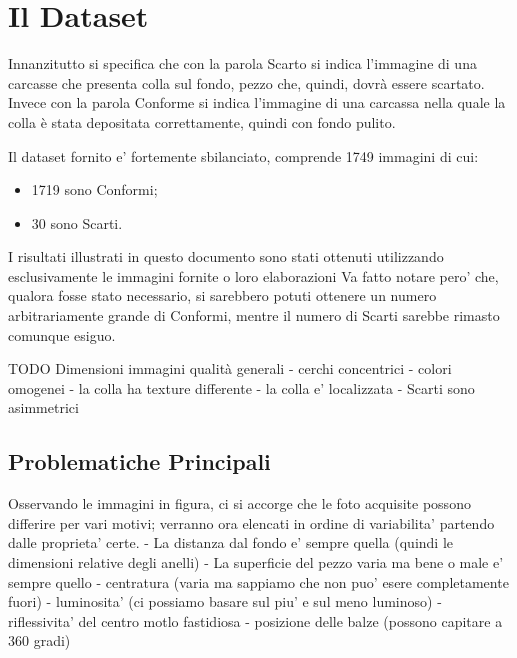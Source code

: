 
\chapter{Il Dataset}

Innanzitutto si specifica che con la parola Scarto si indica l'immagine di una carcasse che presenta colla sul fondo, pezzo che, quindi, dovrà essere scartato.
Invece con la parola Conforme si indica l'immagine di una carcassa nella quale la colla è stata depositata correttamente, quindi con fondo pulito.

Il dataset fornito e' fortemente sbilanciato, comprende 1749 immagini di cui:
\begin{itemize}
    \item 1719 sono Conformi;
    \item 30 sono Scarti.
\end{itemize}
I risultati illustrati in questo documento sono stati ottenuti utilizzando esclusivamente le immagini fornite o loro elaborazioni
Va fatto notare pero' che, qualora fosse stato necessario, si sarebbero potuti ottenere un numero arbitrariamente grande di Conformi, mentre il numero di Scarti sarebbe rimasto comunque esiguo.

TODO
Dimensioni immagini
qualità generali
 - cerchi concentrici
 - colori omogenei
 - la colla ha texture differente
 - la colla e' localizzata
 - Scarti sono asimmetrici




\cleardoublepage


\section{Problematiche Principali}
Osservando le immagini in figura, ci si accorge che le foto acquisite possono differire per vari motivi; verranno ora elencati in ordine di variabilita' partendo dalle proprieta' certe.
 - La distanza dal fondo e' sempre quella (quindi le dimensioni relative degli anelli)
 - La superficie del pezzo varia ma bene o male e' sempre quello
 - centratura (varia ma sappiamo che non puo' esere completamente fuori)
 - luminosita' (ci possiamo basare sul piu' e sul meno luminoso)
 - riflessivita' del centro motlo fastidiosa
 - posizione delle balze (possono capitare a 360 gradi)

